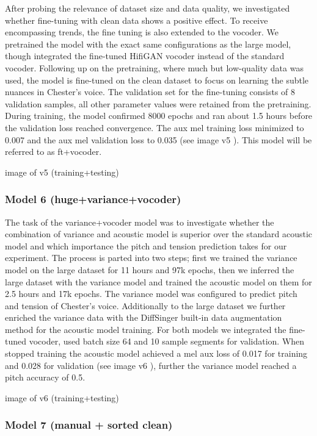 \documentclass[a4paper]{article}
\begin{document}
	After probing the relevance of dataset size and data quality, we investigated whether fine-tuning with clean data shows a positive effect. To receive encompassing trends, the fine tuning is also extended to the vocoder. We pretrained the model with the exact same configurations as the large model, though integrated the fine-tuned HifiGAN vocoder instead of the standard vocoder. Following up on the pretraining, where much but low-quality data was used, the model is fine-tuned on the clean dataset to focus on learning the subtle nuances in Chester’s voice. The validation set for the fine-tuning consists of 8 validation samples, all other parameter values were retained from the pretraining. During training, the model confirmed 8000 epochs and ran about 1.5 hours before the validation loss reached convergence. The aux mel training loss minimized to 0.007 and the aux mel validation loss to 0.035 (see image \color{red}v5\color{black} ). This model will be referred to as ft+vocoder.
	
	\color{red}image of v5 (training+testing)\color{black}
	
	\subsubsection{Model 6 (huge+variance+vocoder)}
	
	The task of the variance+vocoder model was to investigate whether the combination of variance and acoustic model is superior over the standard acoustic model and which importance the pitch and tension prediction takes for our experiment. The process is parted into two steps; first we trained the variance model on the large dataset for 11 hours and 97k epochs, then we inferred the large dataset with the variance model and trained the acoustic model on them for 2.5 hours and 17k epochs. The variance model was configured to predict pitch and tension of Chester’s voice. Additionally to the large dataset we further enriched the variance data with the DiffSinger built-in data augmentation method for the acoustic model training.  For both models we integrated the fine-tuned vocoder, used batch size 64  and 10 sample segments for validation. When stopped training the acoustic model achieved a mel aux loss of 0.017 for training and 0.028 for validation (see image \color{red}v6\color{black} ), further the variance model reached a pitch accuracy of 0.5.
	
	\color{red}image of v6 (training+testing)\color{black}
	
	
	\subsubsection{Model 7 (manual + sorted clean)}
	
\end{document}
